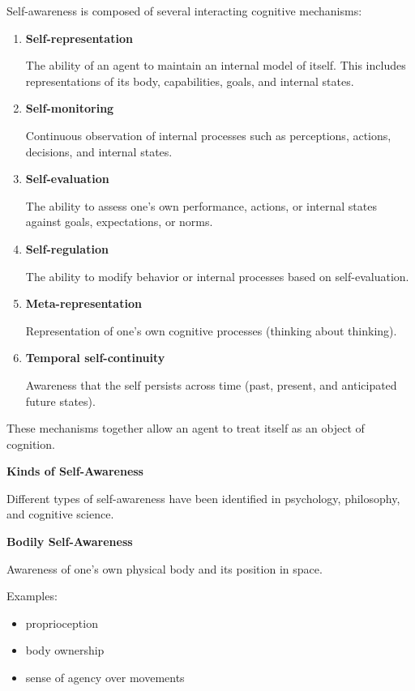 \documentclass{book}
\providecommand{\ProjectDeepHeading}[2]{%
    \par\medskip\noindent\textbf{#2}\par\smallskip
}
\begin{document}
        Self-awareness is composed of several interacting cognitive mechanisms:
        
        \begin{enumerate}[label=\arabic*.]
\item \textbf{Self-representation}

The ability of an agent to maintain an internal model of itself. This includes representations of its body, capabilities, goals, and internal states.

\item \textbf{Self-monitoring}

Continuous observation of internal processes such as perceptions, actions, decisions, and internal states.

\item \textbf{Self-evaluation}

The ability to assess one's own performance, actions, or internal states against goals, expectations, or norms.

\item \textbf{Self-regulation}

The ability to modify behavior or internal processes based on self-evaluation.

\item \textbf{Meta-representation}

Representation of one's own cognitive processes (thinking about thinking).

\item \textbf{Temporal self-continuity}

Awareness that the self persists across time (past, present, and anticipated future states).
        \end{enumerate}
        
        These mechanisms together allow an agent to treat itself as an object of cognition.
    
    
    \ProjectDeepHeading{6}{Kinds of Self-Awareness}
        
        Different types of self-awareness have been identified in psychology, philosophy, and cognitive science.
        
        \ProjectDeepHeading{7}{Bodily Self-Awareness}
            
            Awareness of one's own physical body and its position in space.
            
            Examples:
            \begin{itemize}
                \item proprioception
                \item body ownership
                \item sense of agency over movements
            \end{itemize}
        
\end{document}
